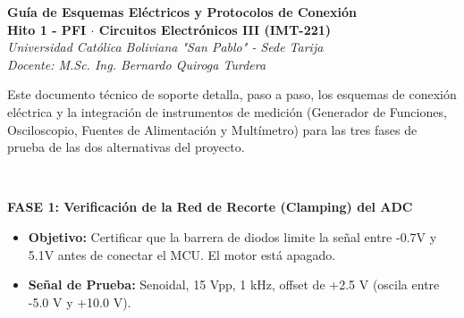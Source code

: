 \documentclass[11pt, a4paper]{article}
\newcommand{\parttitle}[1]{\vspace{0.6cm}\noindent\colorbox{ucborange}{\parbox{\dimexpr\textwidth-2\fboxsep\relax}{\textcolor{white}{\textbf{\Large #1}}}}\vspace{0.2cm}}
\newcommand{\phasetitle}[1]{\vspace{0.4cm}\noindent\textcolor{ucbblue}{\textbf{\large #1}}\vspace{0.1cm}}
\begin{document}
\begin{center}
    {\LARGE \textbf{Guía de Esquemas Eléctricos y Protocolos de Conexión}}\\[0.2cm]
    {\Large \textbf{Hito 1 - PFI $\cdot$ Circuitos Electrónicos III (IMT-221)}}\\[0.2cm]
    \textit{Universidad Católica Boliviana "San Pablo" - Sede Tarija}\\
    \textit{Docente: M.Sc. Ing. Bernardo Quiroga Turdera}
\end{center}
\vspace{0.2cm}

Este documento técnico de soporte detalla, paso a paso, los esquemas de conexión eléctrica y la integración de instrumentos de medición (Generador de Funciones, Osciloscopio, Fuentes de Alimentación y Multímetro) para las tres fases de prueba de las dos alternativas del proyecto.

\parttitle{PARTE I: ALTERNATIVA A - INGENIERÍA MECATRÓNICA}

\phasetitle{FASE 1: Verificación de la Red de Recorte (Clamping) del ADC}
\begin{objective}
\begin{itemize}[leftmargin=*, nosep]
    \item \textbf{Objetivo:} Certificar que la barrera de diodos limite la señal entre -0.7V y 5.1V antes de conectar el MCU. El motor está apagado.
    \item \textbf{Señal de Prueba:} Senoidal, 15 Vpp, 1 kHz, offset de +2.5 V (oscila entre -5.0 V y +10.0 V).
\end{itemize}
\end{objective}
\end{document}

